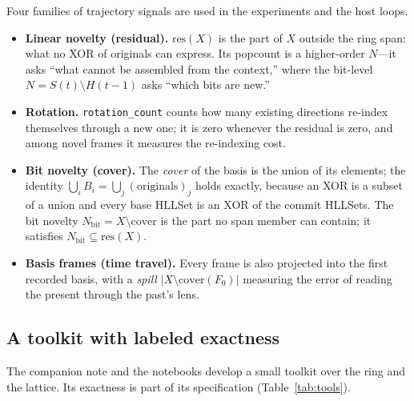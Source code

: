 \documentclass[11pt,a4paper]{article}
\theoremstyle{remark}
\newcommand{\res}{\ensuremath{\mathrm{res}}}          %
\begin{document}
Four families of trajectory signals are used in the experiments and the host
loops.
\begin{itemize}[leftmargin=*,nosep]
  \item \textbf{Linear novelty (residual).} $\res(X)$ is the part of $X$ outside
    the ring span: what no XOR of originals can express. Its popcount is a
    higher-order $N$---it asks ``what cannot be assembled from the context,''
    where the bit-level $N=S(t)\setminus H(t{-}1)$ asks ``which bits are new.''
  \item \textbf{Rotation.} \texttt{rotation\_count} counts how many existing
    directions re-index themselves through a new one; it is zero whenever the
    residual is zero, and among novel frames it measures the re-indexing cost.
  \item \textbf{Bit novelty (cover).} The \emph{cover} of the basis is the union
    of its elements; the identity $\bigcup_i B_i = \bigcup_j (\text{originals})_j$
    holds exactly, because an XOR is a subset of a union and every base HLLSet
    is an XOR of the commit HLLSets. The bit novelty $N_{\mathrm{bit}}=X\setminus\mathrm{cover}$
    is the part no span member can contain; it satisfies
    $N_{\mathrm{bit}}\subseteq \res(X)$.
  \item \textbf{Basis frames (time travel).} Every frame is also projected into
    the first recorded basis, with a \emph{spill}
    $|X\setminus \mathrm{cover}(F_0)|$ measuring the error of reading the present
    through the past's lens.
\end{itemize}

\subsection{A toolkit with labeled exactness}

The companion note and the notebooks develop a small toolkit over the ring and
the lattice. Its exactness is part of its specification (Table~\ref{tab:tools}).
\end{document}
